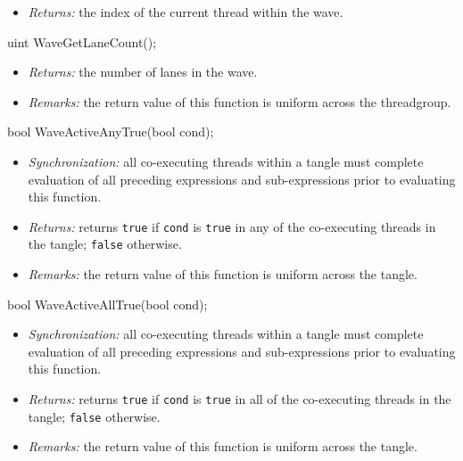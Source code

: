 \begin{itemize}
  \item \textit{Returns:} the index of the current thread within the \gls{wave}.
\end{itemize}

\begin{HLSL}
uint WaveGetLaneCount();
\end{HLSL}

\begin{itemize}
  \item \textit{Returns:} the number of \gls{lane}s in the \gls{wave}.
  \item \textit{Remarks:} the return value of this function is uniform across
  the \gls{threadgroup}.
\end{itemize}

\begin{HLSL}
bool WaveActiveAnyTrue(bool cond);
\end{HLSL}

\begin{itemize}
  \item \textit{Synchronization:} all co-executing threads within a \gls{tangle}
  must complete evaluation of all preceding expressions and sub-expressions
  prior to evaluating this function.
  \item \textit{Returns:} returns \texttt{true} if \texttt{cond} is
  \texttt{true} in any of the co-executing threads in the \gls{tangle};
  \texttt{false} otherwise.
  \item \textit{Remarks:} the return value of this function is uniform across
  the \gls{tangle}.
\end{itemize}

\begin{HLSL}
bool WaveActiveAllTrue(bool cond);
\end{HLSL}

\begin{itemize}
  \item \textit{Synchronization:} all co-executing threads within a \gls{tangle}
  must complete evaluation of all preceding expressions and sub-expressions
  prior to evaluating this function.
  \item \textit{Returns:} returns \texttt{true} if \texttt{cond} is
  \texttt{true} in all of the co-executing threads in the \gls{tangle};
  \texttt{false} otherwise.
  \item \textit{Remarks:} the return value of this function is uniform across
  the \gls{tangle}.
\end{itemize}

